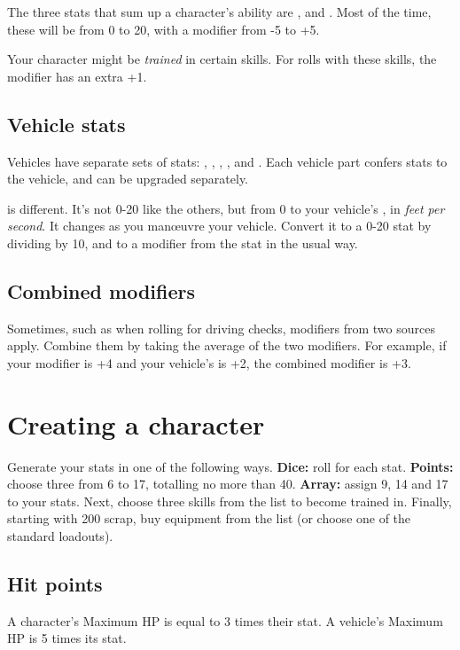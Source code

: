 \documentclass[10pt, a4paper, twocolumn]{article}
\begin{document}
The three stats that sum up a character's ability are ,
 and . Most of the time, these will be from 0 to 20, with
a modifier from -5 to +5. 

Your character might be \emph{trained} in certain skills. For rolls with these
skills, the modifier has an extra +1.

\subsection{Vehicle stats}
Vehicles have separate sets of stats: , ,
, ,  and . Each
vehicle part confers stats to the vehicle, and can be upgraded separately. 

 is different. It's not 0-20 like the others, but from 0 to your
vehicle's , in \emph{feet per second}. It changes as you
man\oe{}uvre your vehicle. Convert it to a 0-20 stat by dividing by 10, and to a
modifier from the stat in the usual way.

\subsection{Combined modifiers}
Sometimes, such as when rolling for driving checks, modifiers from two sources
apply. Combine them by taking the average of the two modifiers. For example, if
your  modifier is +4 and your vehicle's  is +2, the
combined modifier is +3.

\section{Creating a character}
Generate your stats in one of the following ways. \textbf{Dice:} roll 
for each stat. \textbf{Points:} choose three from 6 to 17, totalling no more
than 40. \textbf{Array:} assign 9, 14 and 17 to your stats. Next, choose three
skills from the list to become trained in. Finally, starting with 200 scrap, buy
equipment from the list (or choose one of the standard loadouts).

\subsection{Hit points}
A character's Maximum HP is equal to 3 times their  stat. A
vehicle's Maximum HP is 5 times its  stat.
\end{document}
